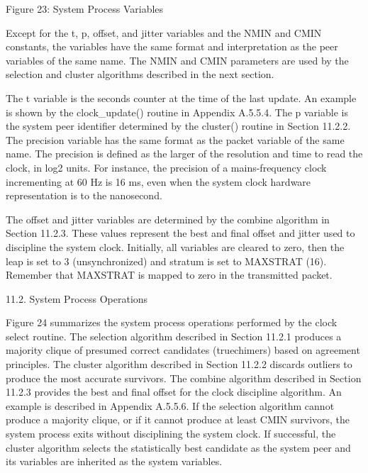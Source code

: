                     Figure 23: System Process Variables

   Except for the t, p, offset, and jitter variables and the NMIN and
   CMIN constants, the variables have the same format and interpretation
   as the peer variables of the same name.  The NMIN and CMIN parameters
   are used by the selection and cluster algorithms described in the
   next section.

   The t variable is the seconds counter at the time of the last update.
   An example is shown by the clock_update() routine in
   Appendix A.5.5.4.  The p variable is the system peer identifier
   determined by the cluster() routine in Section 11.2.2.  The precision
   variable has the same format as the packet variable of the same name.
   The precision is defined as the larger of the resolution and time to
   read the clock, in log2 units.  For instance, the precision of a
   mains-frequency clock incrementing at 60 Hz is 16 ms, even when the
   system clock hardware representation is to the nanosecond.

   The offset and jitter variables are determined by the combine
   algorithm in Section 11.2.3.  These values represent the best and
   final offset and jitter used to discipline the system clock.
  Initially, all variables are cleared to zero, then the leap is set to
   3 (unsynchronized) and stratum is set to MAXSTRAT (16).  Remember
   that MAXSTRAT is mapped to zero in the transmitted packet.

11.2.  System Process Operations

   Figure 24 summarizes the system process operations performed by the
   clock select routine.  The selection algorithm described in
   Section 11.2.1 produces a majority clique of presumed correct
   candidates (truechimers) based on agreement principles.  The cluster
   algorithm described in Section 11.2.2 discards outliers to produce
   the most accurate survivors.  The combine algorithm described in
   Section 11.2.3 provides the best and final offset for the clock
   discipline algorithm.  An example is described in Appendix A.5.5.6.
   If the selection algorithm cannot produce a majority clique, or if it
   cannot produce at least CMIN survivors, the system process exits
   without disciplining the system clock.  If successful, the cluster
   algorithm selects the statistically best candidate as the system peer
   and its variables are inherited as the system variables.


